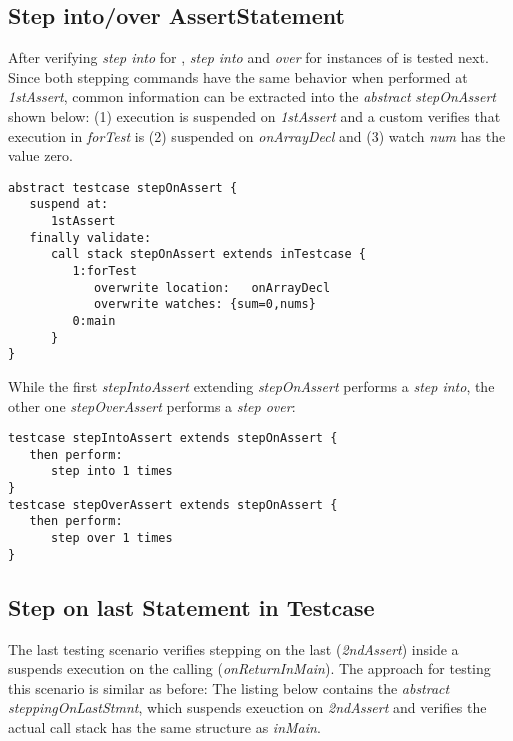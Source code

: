 \subsection{Step into/over AssertStatement}

After verifying \emph{step into} for , 
\emph{step into} and \emph{over} for instances of  is tested
next. Since both stepping commands have the same behavior when performed at
\emph{1stAssert}, common information can be extracted into the \emph{abstract}
 \emph{stepOnAssert} shown below: (1) execution is
suspended on \emph{1stAssert} and a custom  verifies that
execution in \emph{forTest} is (2) suspended on \emph{onArrayDecl} and
(3) watch \emph{num} has the value zero.
 
\begin{lstlisting}[language=testingDSL]
abstract testcase stepOnAssert {
   suspend at: 
      1stAssert
   finally validate:
      call stack stepOnAssert extends inTestcase {
         1:forTest
            overwrite location:   onArrayDecl
            overwrite watches: {sum=0,nums}
         0:main                      
      }
}
\end{lstlisting}

While the first  \emph{stepIntoAssert} extending
\emph{stepOnAssert} performs a \emph{step into}, the other one
\emph{stepOverAssert} performs a \emph{step over}:

\begin{lstlisting}[language=testingDSL]
testcase stepIntoAssert extends stepOnAssert {            
   then perform:                         
      step into 1 times                            
}
testcase stepOverAssert extends stepOnAssert {            
   then perform:                         
      step over 1 times                            
}
\end{lstlisting}

\subsection{Step on last Statement in Testcase}

The last testing scenario verifies stepping on the last 
(\emph{2ndAssert}) inside a  suspends execution on the calling
 (\emph{onReturnInMain}).
The approach for testing this scenario is similar as before:
The listing below contains the \emph{abstract} 
\emph{steppingOnLastStmnt}, which suspends exeuction on
\emph{2ndAssert} and verifies the actual call stack has the same structure as
\emph{inMain}.

